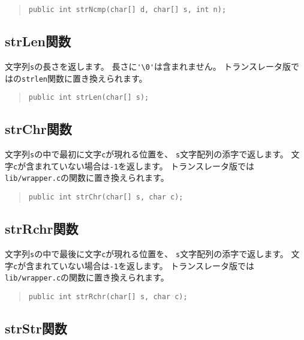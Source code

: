\begin{quote}
\begin{verbatim}
public int strNcmp(char[] d, char[] s, int n);
\end{verbatim}
\end{quote}

\subsection{strLen関数}

文字列\verb/s/の長さを返します。
長さに\verb/'\0'/は含まれません。
トランスレータ版では\cl の\verb/strlen/関数に置き換えられます。

\begin{quote}
\begin{verbatim}
public int strLen(char[] s);
\end{verbatim}
\end{quote}

\subsection{strChr関数}

文字列\verb/s/の中で最初に文字\verb/c/が現れる位置を、
\verb/s/文字配列の添字で返します。
文字\verb/c/が含まれていない場合は\verb/-1/を返します。
トランスレータ版では\verb;lib/wrapper.c;の関数に置き換えられます。

\begin{quote}
\begin{verbatim}
public int strChr(char[] s, char c);
\end{verbatim}
\end{quote}

\subsection{strRchr関数}

文字列\verb/s/の中で最後に文字\verb/c/が現れる位置を、
\verb/s/文字配列の添字で返します。
文字\verb/c/が含まれていない場合は\verb/-1/を返します。
トランスレータ版では\verb;lib/wrapper.c;の関数に置き換えられます。

\begin{quote}
\begin{verbatim}
public int strRchr(char[] s, char c);
\end{verbatim}
\end{quote}

\subsection{strStr関数}

